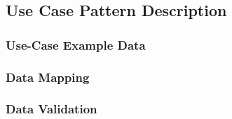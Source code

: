 \subsection*{Use Case Pattern Description}



\subsubsection*{Use-Case Example Data}


\subsubsection*{Data Mapping}


\subsubsection*{Data Validation}
